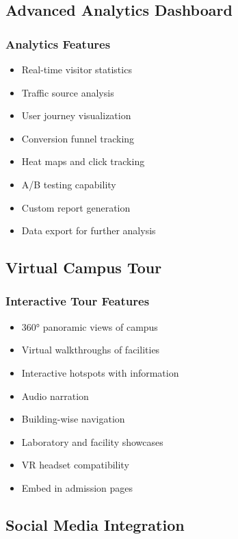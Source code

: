 \documentclass[12pt,a4paper]{report}
\begin{document}
\subsection{Advanced Analytics Dashboard}

\subsubsection*{Analytics Features}
\begin{itemize}
    \item Real-time visitor statistics
    \item Traffic source analysis
    \item User journey visualization
    \item Conversion funnel tracking
    \item Heat maps and click tracking
    \item A/B testing capability
    \item Custom report generation
    \item Data export for further analysis
\end{itemize}

\subsection{Virtual Campus Tour}

\subsubsection*{Interactive Tour Features}
\begin{itemize}
    \item 360° panoramic views of campus
    \item Virtual walkthroughs of facilities
    \item Interactive hotspots with information
    \item Audio narration
    \item Building-wise navigation
    \item Laboratory and facility showcases
    \item VR headset compatibility
    \item Embed in admission pages
\end{itemize}

\subsection{Social Media Integration}
\end{document}
